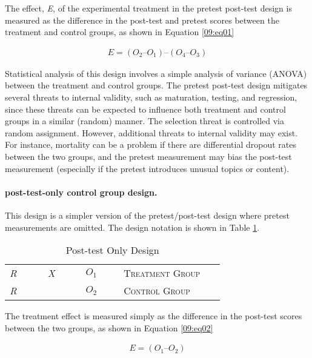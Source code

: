 The effect, \textit{E}, of the experimental treatment in the pretest post-test design is measured as the difference in the post-test and pretest scores between the treatment and control groups, as shown in Equation \ref{09:eq01}

\begin{align}
	\label{09:eq01}
	E = (O_2 – O_1) – (O_4 – O_3)
\end{align}

Statistical analysis of this design involves a simple analysis of variance (ANOVA) between the treatment and control groups. The pretest post-test design mitigates several threats to internal validity, such as maturation, testing, and regression, since these threats can be expected to influence both treatment and control groups in a similar (random) manner. The selection threat is controlled via random assignment. However, additional threats to internal validity may exist. For instance, mortality can be a problem if there are differential dropout rates between the two groups, and the pretest measurement may bias the post-test measurement (especially if the pretest introduces unusual topics or content).

\paragraph{post-test-only control group design.} This design is a simpler version of the pretest/post-test design where pretest measurements are omitted. The design notation is shown in Table \ref{09:tab02}.

\begin{table}[H]
	\centering
	\begin{tabularx}{0.90\linewidth}{p{0.15\linewidth}p{0.15\linewidth}p{0.15\linewidth}p{0.40\linewidth}}
		\toprule
		\textit{R} & \textit{X} & $ O_1 $ & \textsc{Treatment Group} \\
		\textit{R} &            & $ O_2 $ & \textsc{Control Group} \\
		\bottomrule
	\end{tabularx}
	\caption{Post-test Only Design}
	\label{09:tab02}
\end{table}

The treatment effect is measured simply as the difference in the post-test scores between the two groups, as shown in Equation \ref{09:eq02}

\begin{align}
	\label{09:eq02}
	E = (O_1 – O_2)
\end{align}

